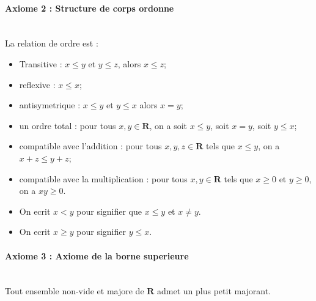 \paragraph{Axiome 2 : Structure de corps ordonne}~\\
La relation de ordre est :
\begin{itemize}
\item Transitive : $x\le y$ et $y\le z$, alors $x\le z$;
\item reflexive : $x\le x$;
\item antisymetrique : $x\le y$ et $y\le x$ alors $x=y$;
\item un ordre total : pour tous $x,y\in \mathbf{R}$, on a soit $x\le y$, soit $x=y$, soit $y\le x$;
\item compatible avec l'addition : pour tous $x,y,z\in \mathbf{R}$ tels que $x\le y$, on a $x+z\le y+z$;
\item compatible avec la multiplication : pour tous $x,y\in \mathbf{R}$ tels que $x\ge 0$ et $y\ge 0$, on a $xy\ge 0$.
\end{itemize}

\begin{remark}
\begin{itemize}
\item On ecrit $x<y$ pour signifier que $x\le y$ et $x\neq y$.
\item On ecrit $x\ge y$ pour signifier $y\le x$.
\end{itemize}
\end{remark}

\paragraph{Axiome 3 : Axiome de la borne superieure}~\\
Tout ensemble non-vide et majore de $\mathbf{R}$ admet un plus petit majorant.

